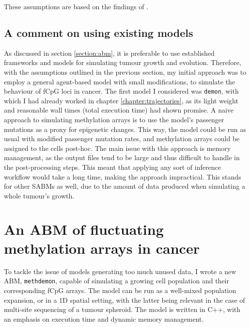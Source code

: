 These assumptions are based on the findings of \cite{gabbutt_fluctuating_2022,
gabbutt_evolutionary_2023}.

\subsection{A comment on using existing models}\label{section:old_famework}

As discussed in section \ref{section:abm}, it is preferable to use established
frameworks and models for simulating tumour growth and evolution. Therefore,
with the assumptions outlined in the previous section, my initial approach was
to employ a general agent-based model with small modifications, to simulate the
behaviour of fCpG loci in cancer. The first model I considered was
\texttt{demon}, with which I had already worked in chapter
\ref{chapter:trajectories}, as its light weight and reasonable wall times
(total execution time) had shown promise. A naive approach to simulating
methylation arrays is to use the model's passenger mutations as a proxy for
epigenetic changes. This way, the model could be run as usual with modified
passenger mutation rates, and methylation arrays could be assigned to the cells
post-hoc. The main issue with this approach is memory management, as the output
files tend to be large and thus difficult to handle in the post-processing
steps. This meant that applying any sort of inference workflow would take a
long time, making the approach impractical. This stands for other SABMs as
well, due to the amount of data produced when simulating a whole tumour's
growth.

\section{An ABM of fluctuating methylation arrays in
cancer}\label{section:methdemon}
To tackle the issue of models generating too much unused data, I wrote a new
ABM, \texttt{methdemon}, capable of simulating a growing cell population and
their corresponding fCpG arrays. The model can be run as a well-mixed population
expansion, or in a 1D spatial setting, with the latter being relevant in the
case of multi-site sequencing of a tumour spheroid. The model is written in C++,
with an emphasis on execution time and dynamic memory management.

